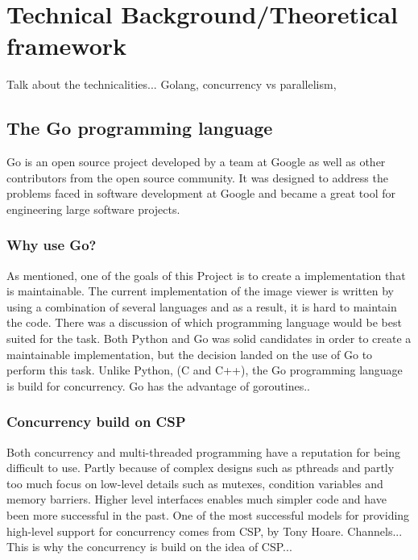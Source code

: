 \documentclass[12pt, a4paper, oneside]{article}
\begin{document}
\section{Technical Background/Theoretical framework}
Talk about the technicalities... Golang, concurrency vs parallelism,
\subsection{The Go programming language}
Go is an open source project developed by a team at Google as well as other contributors from the open source community. It was designed to address the problems faced in software development at Google and became a great tool for engineering large software projects.

\subsubsection{Why use Go?}
As mentioned, one of the goals of this Project is to create a implementation that is maintainable. The current implementation of the image viewer is written by using a combination of several languages and as a result, it is hard to maintain the code. 
There was a discussion of which programming language would be best suited for the task. Both Python and Go was solid candidates in order to create a maintainable implementation, but the decision landed on the use of Go to perform this task.
Unlike Python, (C and C++), the Go programming language is build for concurrency. 
Go has the advantage of goroutines..

\subsubsection{Concurrency build on CSP}
Both concurrency and multi-threaded programming have a reputation for being difficult to use. Partly because of complex designs such as pthreads and partly too much focus on low-level details such as mutexes, condition variables and memory barriers. Higher level interfaces enables much simpler code and have been more successful in the past. One of the most successful models for providing high-level support for concurrency comes from CSP, by Tony Hoare. 
Channels... 
This is why the concurrency is build on the idea of CSP...
\end{document}
